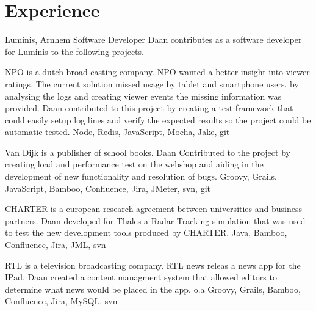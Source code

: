 \section*{Experience}
	\begin{workExperience}{Luminis, Arnhem}%
	{Software Developer}{}	
                Daan contributes as a software developer for Luminis
                to the following projects.
                
                NPO is a dutch broad casting company. NPO wanted a
                better insight into viewer ratings. The current
                solution missed usage by tablet and smartphone users.
                by analysing the logs and creating viewer events the
                missing information was provided.
                Daan contributed to this project by creating a test
                framework that could easily setup log lines and verify
                the expected results so the project could be automatic
                tested. 
                \technics Node, Redis, JavaScript, Mocha, Jake, git

                Van Dijk is a publisher of school books. Daan
                Contributed to the project by creating load and
                performance test on the webshop and aiding in the
                development of new functionality and resolution of bugs.
                \technics Groovy, Grails, JavaScript, Bamboo,
                Confluence, Jira, JMeter, svn, git

                CHARTER is a european research agreement between
                universities and business partners. Daan developed for
                Thales a Radar Tracking simulation that was used to
                test the new development tools produced by CHARTER.
                \technics Java, Bamboo, Confluence, Jira, JML, svn

                RTL is a television broadcasting company. RTL news
                releas a news app for the IPad. Daan created a content
                managment system that allowed editors to determine
                what news would be placed in the app.
                \technics o.a Groovy, Grails, Bamboo, Confluence,
                Jira, MySQL, svn
	\end{workExperience}

